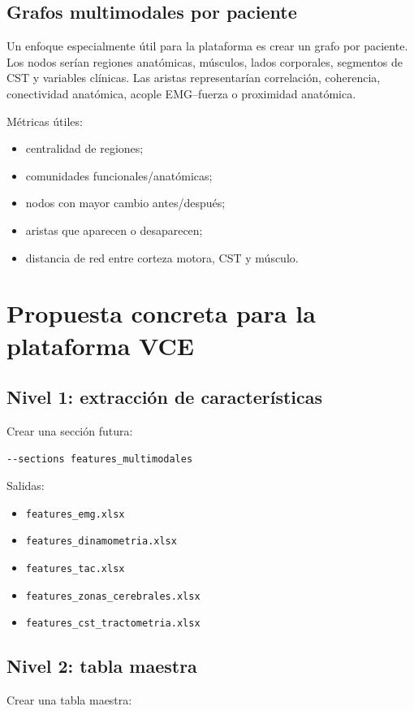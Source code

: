 \documentclass[conference]{IEEEtran}
\begin{document}
\subsection{Grafos multimodales por paciente}
Un enfoque especialmente útil para la plataforma es crear un grafo por paciente. Los nodos serían regiones anatómicas, músculos, lados corporales, segmentos de CST y variables clínicas. Las aristas representarían correlación, coherencia, conectividad anatómica, acople EMG--fuerza o proximidad anatómica.

Métricas útiles:

\begin{itemize}[leftmargin=*]
    \item centralidad de regiones;
    \item comunidades funcionales/anatómicas;
    \item nodos con mayor cambio antes/después;
    \item aristas que aparecen o desaparecen;
    \item distancia de red entre corteza motora, CST y músculo.
\end{itemize}

\section{Propuesta concreta para la plataforma VCE}
\subsection{Nivel 1: extracción de características}
Crear una sección futura:

\begin{verbatim}
--sections features_multimodales
\end{verbatim}

Salidas:

\begin{itemize}[leftmargin=*]
    \item \texttt{features\_emg.xlsx}
    \item \texttt{features\_dinamometria.xlsx}
    \item \texttt{features\_tac.xlsx}
    \item \texttt{features\_zonas\_cerebrales.xlsx}
    \item \texttt{features\_cst\_tractometria.xlsx}
\end{itemize}

\subsection{Nivel 2: tabla maestra}
Crear una tabla maestra:
\end{document}
